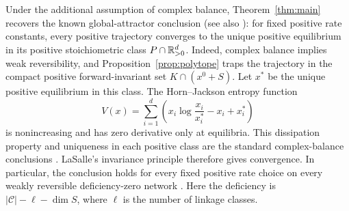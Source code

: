 \begin{remark}
\label{rem:complex-balanced-convergence}
Under the additional assumption of complex balance,
Theorem~\ref{thm:main} recovers the known global-attractor conclusion
(see also \cite{Craciun2026}): for fixed positive rate constants, every
positive trajectory converges to the unique positive equilibrium in its
positive stoichiometric class $P\cap\mathbb R_{>0}^d$.
Indeed, complex balance implies weak reversibility, and
Proposition~\ref{prop:polytope} traps the trajectory in the compact positive
forward-invariant set $K\cap(x^0+S)$. Let $x^*$ be the unique positive
equilibrium in this class. The Horn--Jackson entropy function
\[
 V(x)=\sum_{i=1}^d
 \left(x_i\log\frac{x_i}{x_i^*}-x_i+x_i^*\right)
\]
is nonincreasing and has zero derivative only at equilibria. This
dissipation property and uniqueness in each positive class are the
standard complex-balance conclusions
\cite[Proposition~5.3 and Corollaries~5.4--5.5]{FeinbergLectures1979}.
LaSalle's invariance principle therefore gives convergence.
In particular, the conclusion holds for every fixed positive rate choice
on every weakly reversible deficiency-zero network
\cite[Corollary~5.10]{FeinbergLectures1979}. Here the deficiency is
$|\mathcal C|-\ell-\dim S$, where $\ell$ is the number of linkage classes.
\end{remark}
